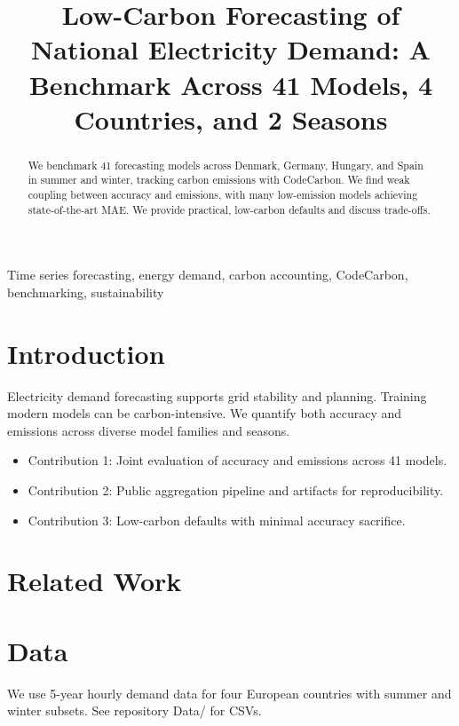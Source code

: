 \documentclass[10pt,conference]{IEEEtran}
\title{Low-Carbon Forecasting of National Electricity Demand: A Benchmark Across 41 Models, 4 Countries, and 2 Seasons}
\author{%
  \IEEEauthorblockN{First Last}\IEEEauthorblockA{Affiliation\\ email@example.com}
  \and
  \IEEEauthorblockN{First Last}\IEEEauthorblockA{Affiliation\\ email@example.com}
  \and
  \IEEEauthorblockN{First Last}\IEEEauthorblockA{Affiliation\\ email@example.com}
}
\begin{document}
\maketitle

\begin{abstract}
We benchmark 41 forecasting models across Denmark, Germany, Hungary, and Spain in summer and winter, tracking carbon emissions with CodeCarbon. We find weak coupling between accuracy and emissions, with many low-emission models achieving state-of-the-art MAE. We provide practical, low-carbon defaults and discuss trade-offs.
\end{abstract}

\begin{IEEEkeywords}
Time series forecasting, energy demand, carbon accounting, CodeCarbon, benchmarking, sustainability
\end{IEEEkeywords}

\section{Introduction}
Electricity demand forecasting supports grid stability and planning. Training modern models can be carbon-intensive. We quantify both accuracy and emissions across diverse model families and seasons.
\begin{itemize}
  \item Contribution 1: Joint evaluation of accuracy and emissions across 41 models.
  \item Contribution 2: Public aggregation pipeline and artifacts for reproducibility.
  \item Contribution 3: Low-carbon defaults with minimal accuracy sacrifice.
\end{itemize}

\section{Related Work}
\cite{lacoste2019quantifying,henderson2020systematic}

\section{Data}
We use 5-year hourly demand data for four European countries with summer and winter subsets. See repository Data/ for CSVs.
\end{document}
